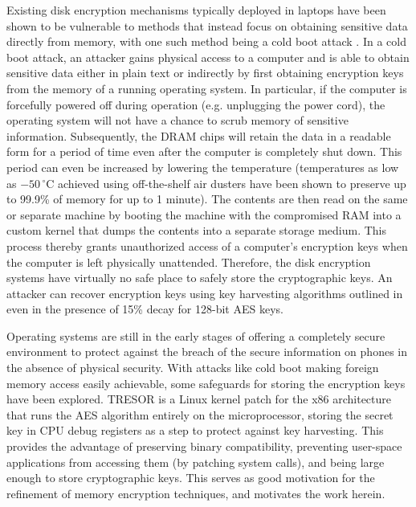 \documentclass[conference,10pt]{IEEEtran}
\begin{document}
Existing disk encryption mechanisms typically deployed in laptops have been shown to be vulnerable 
to methods that instead focus on obtaining sensitive data directly from memory, with one such method 
being a cold boot attack \cite{coldboot}.  In a cold boot attack, an attacker gains physical access 
to a computer and is able to obtain sensitive data either in plain text or indirectly by first 
obtaining encryption keys from the memory of a running operating system.  In particular, if the 
computer is forcefully powered off during operation (e.g. unplugging the power cord), the operating 
system will not have a chance to scrub memory of sensitive information.  Subsequently, the DRAM 
chips will retain the data in a readable form for a period of time even after the computer is 
completely shut down.  This period can even be increased by lowering the temperature (temperatures 
as low as $-50\,^{\circ}\mathrm{C}$ achieved using off-the-shelf air dusters have been shown to 
preserve up to 99.9\% of memory for up to 1 minute).  The contents are then read on the same or 
separate machine by booting the machine with the compromised RAM into a custom kernel that dumps the 
contents into a separate storage medium.  This process thereby grants unauthorized access of a 
computer's encryption keys when the computer is left physically unattended.  Therefore, the disk 
encryption systems have virtually no safe place to safely store the cryptographic keys.  An attacker 
can recover encryption keys using key harvesting algorithms outlined in \cite{coldboot} even in the 
presence of 15\% decay for 128-bit AES keys.

Operating systems are still in the early stages of offering a completely secure environment to 
protect against the breach of the secure information on phones in the absence of physical security.  
With attacks like cold boot making foreign memory access easily achievable, some safeguards for 
storing the encryption keys have been explored.  TRESOR \cite{tresor} is a Linux kernel patch for 
the x86 architecture that runs the AES algorithm entirely on the microprocessor, storing the secret 
key in CPU debug registers as a step to protect against key harvesting.  This provides the advantage 
of preserving binary compatibility, preventing user-space applications from accessing them (by 
patching system calls), and being large enough to store cryptographic keys.  This serves as good 
motivation for the refinement of memory encryption techniques, and motivates the work herein.
\end{document}
